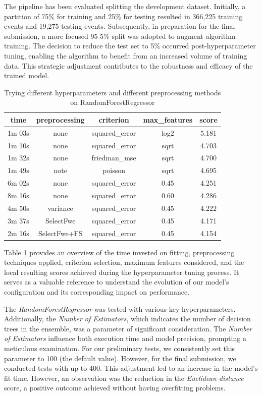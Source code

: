 \documentclass[conference]{IEEEtran}
\begin{document}
The pipeline has been evaluated splitting the development dataset. 
Initially, a partition of 75\% for training and 25\% for testing resulted in 366,225 training 
events and 19,275 testing events. Subsequently, in preparation for the final submission, 
a more focused 95-5\% split was adopted to augment algorithm training. 
The decision to reduce the test set to 5\% occurred post-hyperparameter tuning, enabling the 
algorithm to benefit from an increased volume of training data. This strategic adjustment 
contributes to the robustness and efficacy of the trained model.

\begin{table}[htbp]
\centering
\begin{tabular}{|c|c|c|c|c|} \hline
time&  preprocessing&  criterion&  max\_features& score\\ \hline
1m 03s&  none&  squared\_error&  log2& 5.181\\ \hline
1m 10s&  none&  squared\_error&  sqrt& 4.703\\ \hline
1m 32s&  none&  friedman\_mse&  sqrt& 4.700\\ \hline
1m 49s&  note&  poisson&  sqrt& 4.695\\ \hline
6m 02s&  none&  squared\_error&  0.45& 4.251\\ \hline
8m 16s&  none&  squared\_error&  0.60& 4.286\\ \hline
4m 50s&  variance&  squared\_error&  0.45& 4.222\\ \hline
3m 37s&  SelectFwe&  squared\_error&  0.45& 4.171\\ \hline
2m 16s&  SelectFwe+FS&  squared\_error&  0.45& 4.154\\ \hline
\end{tabular}
\caption{Trying different hyperparameters and different preprocessing methods on RandomForestRegressor}
\label{tab:hyperparameters_table}
\end{table}

Table \ref{tab:hyperparameters_table} provides an overview of the time invested on fitting, 
preprocessing techniques applied, criterion selection, maximum features considered, 
and the local resulting scores achieved during the hyperparameter tuning process. 
It serves as a valuable reference to understand the evolution of our model's 
configuration and its corresponding impact on performance.

The \textit{RandomForestRegressor} was tested with various key hyperparameters. 
Additionally, the \textit{Number of Estimators}, which indicates the number
of decision trees in the ensemble, was a parameter of significant consideration.
The \textit{Number of Estimators} influence both execution time and model precision, 
prompting a meticulous examination. For our preliminary tests, we consistently set 
this parameter to 100 (the default value). 
However, for the final submission, we conducted tests with up to
400. This adjustment led to an increase in the model's fit time. 
However, an observation was the reduction in the \textit{Euclidean distance}
score, a positive outcome achieved without having overfitting problems.
\end{document}
